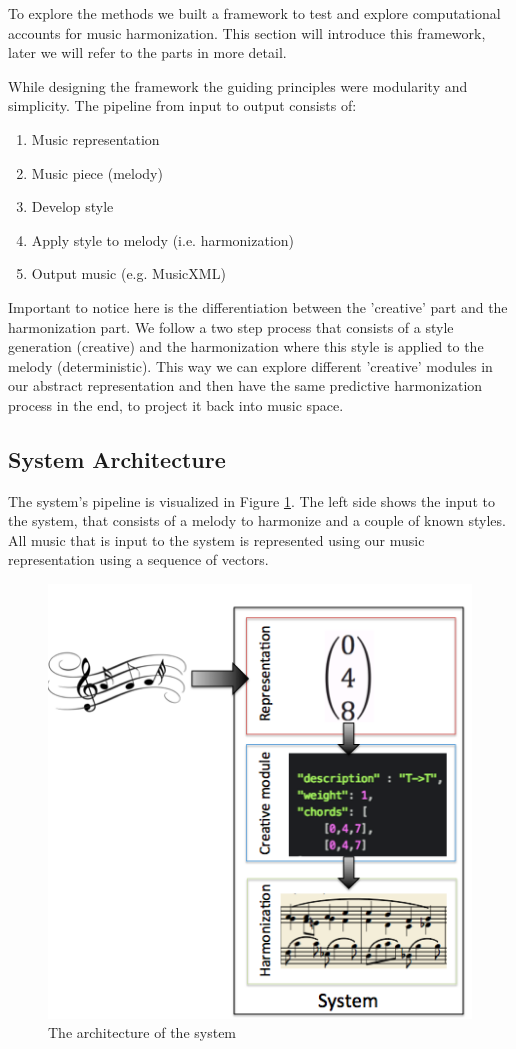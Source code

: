 To explore the methods we built a framework to test and explore computational accounts for music harmonization. This section will introduce this framework, later we will refer to the parts in more detail.

While designing the framework the guiding principles were modularity and simplicity. The pipeline from input to output consists of:
\begin{enumerate}
  \item Music representation
  \item Music piece (melody)
  \item Develop style
  \item Apply style to melody (i.e. harmonization)
  \item Output music (e.g. MusicXML)
\end{enumerate}

Important to notice here is the differentiation between the 'creative' part and the harmonization part. We follow a two step process that consists of a style generation (creative) and the harmonization where this style is applied to the melody (deterministic). This way we can explore different 'creative' modules in our abstract representation and then have the same predictive harmonization process in the end, to project it back into music space.

\subsection{System Architecture}
The system's pipeline is visualized in Figure \ref{fig:arch}. The left side shows the input to the system, that consists of a melody to harmonize and a couple of known styles. All music that is input to the system is represented using our music representation using a sequence of vectors.
\begin{figure}
\includegraphics[scale=1]{Chapters/pic/sys_arch.png}
\caption{The architecture of the system}
\label{fig:arch}
\end{figure}


